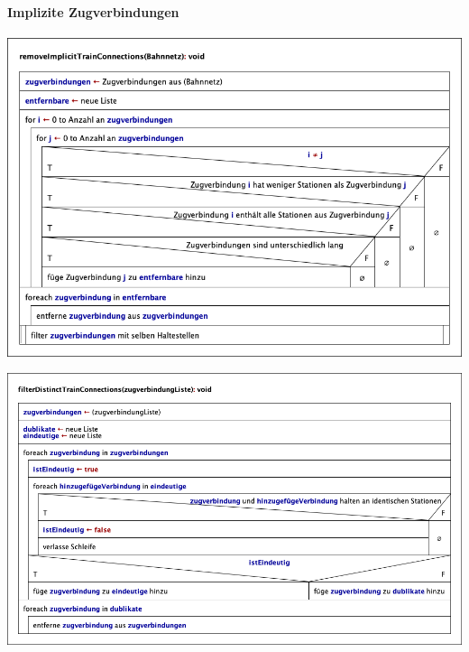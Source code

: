 \paragraph{Implizite Zugverbindungen}\label{pro:subsubsubsec:implizite-zugverbindungen}
\begin{center}
    \includegraphics[width=\linewidth]{images/Struktogramme/reducer/reduction3/removeImplicitTrainConnections.png}
    \label{pro:subsubsecpar:entfernen-von-impliziten-zugverbindungen}
\end{center}

\begin{center}
    \includegraphics[width=\linewidth]{images/Struktogramme/reducer/reduction3/filterDistinctTrainConnections.png}
    \label{pro:subsubsecpar:ueberpruefung-ob-zugverbindung-implizit-ist}
\end{center}

